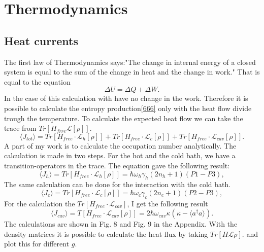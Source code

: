 \documentclass[12pt,a4paper]{article}
\begin{document}
\section{Thermodynamics}
\subsection{Heat currents}
The first law of Thermodynamics says:"The change in internal energy of a closed system is equal to the sum of the change in heat and the change in work."
That is  equal to the equation
\begin{equation}
\Delta U=\Delta Q+\Delta W.
\end{equation}
In the case of this calculation with have no change in the work. Therefore it is possible to calculate the entropy production\eqref{666} only with the heat flow divide trough the temperature.
To calculate the expected heat flow we can take the trace from $Tr[H_{frre}\mathcal{L}[\rho]]$. 
\begin{equation}
\langle J_{tot}\rangle=Tr[H_{free}\cdot \mathcal{L}_h[\rho]]+Tr[H_{free}\cdot \mathcal{L}_c[\rho]]+Tr[H_{free}\cdot \mathcal{L}_{cav}[\rho]].\label{13}
\end{equation}
A part of my work is to calculate the occupation number analytically. 
The calculation is made in two steps. For the hot and the cold bath, we have a transition-operators in the trace.
The equation gave the following result:
\begin{equation}
\langle J_h \rangle=Tr[H_{free}\cdot \mathcal{L}_h[\rho]]=\hbar \omega_h \gamma_h (2n_h+1) ( P1-P3) ,
\end{equation}
The same calculation can be done for the interaction with the cold bath.
\begin{equation}
\langle J_c \rangle=Tr[H_{free}\cdot \mathcal{L}_c[\rho]]=\hbar \omega_c \gamma_c (2n_c+1) ( P2-P3) ,
\end{equation}
For the calculation the $Tr[H_{free}\cdot \mathcal{L}_{cav}]$, I get the following result
\begin{equation}
\langle J_{cav}\rangle=T[H_{free}\cdot \mathcal{L}_{cav}[\rho]]=2\hbar \omega_{cav}\kappa (\kappa-\langle a^{\dag{}}a \rangle).
\end{equation}
The calculations are shown in Fig. 8 and Fig. 9 in the Appendix.
With the density matrices it is possible to calculate the heat flux by taking $Tr[H \mathcal{L}\rho]$. 
and plot this for different  $g$. 
\end{document}
